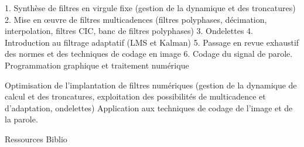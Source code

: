{
1.	Synthèse de filtres en virgule fixe (gestion de la dynamique et des troncatures)
2.	Mise en \oe uvre de filtres multicadences (filtres polyphases, décimation, interpolation, filtres CIC, banc de filtres polyphases)
3.	Ondelettes
4.	Introduction au filtrage adaptatif (LMS et Kalman)
5.	Passage en revue exhaustif des normes et des techniques de codage en image
6.	Codage du signal de parole.
} 
{Programmation graphique et traitement numérique} 
{\begin{itemize}
\ObjItem Optimisation de l'implantation de filtres numériques (gestion de la dynamique de calcul et des troncatures, exploitation des possibilités de multicadence et d'adaptation, ondelettes)
\ObjItem Application aux techniques de codage de l'image et de la parole.
\end{itemize} 
} 
{Ressources} 
{Biblio} 
 
\vfill
